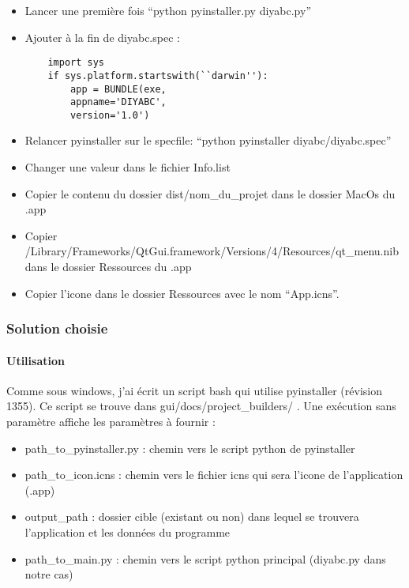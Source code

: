 \documentclass[12pt,a4paper]{article}
\begin{document}
        \label{mac_pyinstaller}
        \begin{itemize}
            \item Lancer une première fois ``python pyinstaller.py diyabc.py''
            \item Ajouter à la fin de diyabc.spec :
        \begin{verbatim}
    import sys 
    if sys.platform.startswith(``darwin''): 
        app = BUNDLE(exe, 
        appname='DIYABC', 
        version='1.0')
        \end{verbatim}
            \item Relancer pyinstaller sur le specfile: ``python pyinstaller diyabc/diyabc.spec''
            \item Changer une valeur dans le fichier Info.list
            \item Copier le contenu du dossier dist/nom\_du\_projet dans le dossier MacOs du .app
            \item Copier /Library/Frameworks/QtGui.framework/Versions/4/Resources/qt\_menu.nib dans le dossier Ressources du .app
            \item Copier l'icone dans le dossier Ressources avec le nom ``App.icns''.\\
        \end{itemize}

        \subsubsection{Solution choisie}
        \paragraph{Utilisation}

        Comme sous windows, j'ai écrit un script bash qui utilise pyinstaller
        (révision 1355). Ce script se trouve dans
        gui/docs/project\_builders/ .  Une exécution sans
        paramètre affiche les paramètres à fournir : \\

        \begin{itemize}
            \item path\_to\_pyinstaller.py : chemin vers le script python de pyinstaller
            \item path\_to\_icon.icns : chemin vers le fichier icns qui sera l'icone de l'application (.app)
            \item output\_path : dossier cible (existant ou non) dans lequel se trouvera l'application et les données du programme
            \item path\_to\_main.py : chemin vers le script python principal (diyabc.py dans notre cas)\\
        \end{itemize}
\end{document}
